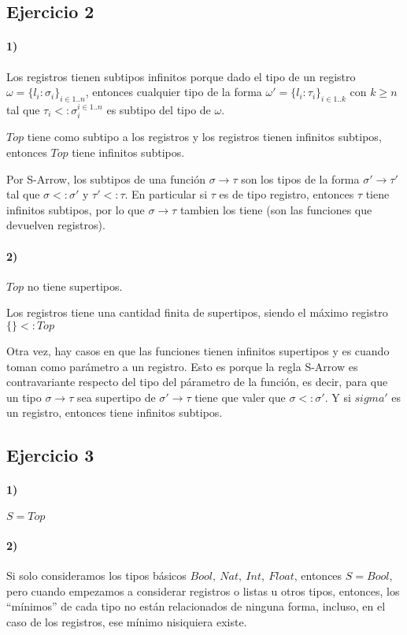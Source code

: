\documentclass[10pt,a4paper, landscape]{article}
\begin{document}
\subsection{Ejercicio 2}
\begin{multicols}{2}
\paragraph{1)} Los registros tienen subtipos infinitos porque dado el tipo de un registro $\omega = \{l_i:\sigma_i\}_{i\in 1..n}$, entonces cualquier tipo de la forma $\omega' = \{l_i:\tau_i\}_{i\in 1..k}$ con $k \geq n$ tal que  $\tau_i <: \sigma_i^{i\in 1..n}$ es subtipo del tipo de $\omega$.

$Top$ tiene como subtipo a los registros y los registros tienen infinitos subtipos, entonces $Top$ tiene infinitos subtipos.

Por S-Arrow, los subtipos de una función $\sigma\to\tau$ son los tipos de la forma $\sigma' \to \tau'$ tal que $\sigma <: \sigma'$ y $\tau' <: \tau$. En particular si $\tau$ es de tipo registro, entonces $\tau$ tiene infinitos subtipos, por lo que $\sigma\to\tau$ tambien los tiene (son las funciones que devuelven registros). 

\paragraph{2)} $Top$ no tiene supertipos.

Los registros tiene una cantidad finita de supertipos, siendo el máximo registro $\{\} <: Top$

Otra vez, hay casos en que las funciones tienen infinitos supertipos y es cuando toman como parámetro a un registro. Esto es porque la regla S-Arrow es contravariante respecto del tipo del párametro de la función, es decir, para que un tipo $\sigma\to\tau$ sea supertipo de $\sigma'\to\tau$ tiene que valer que $\sigma <: \sigma'$. Y si $sigma'$ es un registro, entonces tiene infinitos subtipos.

\subsection{Ejercicio 3}

\paragraph{1)} $S = Top$
\paragraph{2)} Si solo consideramos los tipos básicos $Bool,~Nat,~Int,~Float$, entonces $S=Bool$, pero cuando empezamos a considerar registros o listas u otros tipos, entonces, los ``mínimos'' de cada tipo no están relacionados de ninguna forma, incluso, en el caso de los registros, ese mínimo nisiquiera existe.

\end{multicols}
\end{document}
